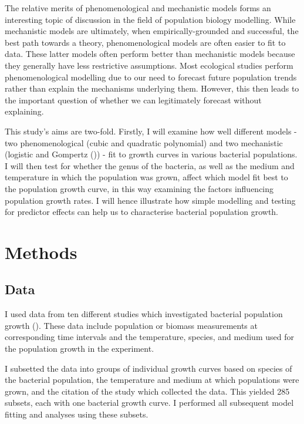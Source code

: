 \documentclass[11pt]{article}
\begin{document}
	The relative merits of phenomenological and mechanistic models forms an interesting topic of discussion in the field of population biology modelling. While mechanistic models are ultimately, when empirically-grounded and successful, the best path towards a theory, phenomenological models are often easier to fit to data. These latter models often perform better than mechanistic models because they generally have less restrictive assumptions. Most ecological studies perform phenomenological modelling due to our need to forecast future population trends rather than explain the mechanisms underlying them. However, this then leads to the important question of whether we can legitimately forecast without explaining.

	This study's aims are two-fold. Firstly, I will examine how well different models - two phenomenological (cubic and quadratic polynomial) and two mechanistic (logistic and Gompertz (\cite{gompertz1825xxiv})) - fit to growth curves in various bacterial populations. I will then test for whether the genus of the bacteria, as well as the medium and temperature in which the population was grown, affect which model fit best to the population growth curve, in this way examining the factors influencing population growth rates. I will hence illustrate how simple modelling and testing for predictor effects can help us to characterise bacterial population growth.

	
	\section{Methods}
	
	\subsection{Data}
	
	I used data from ten different studies which investigated bacterial population growth (\cite{bae2014growth, bernhardt2018metabolic, galarz2016predicting, gill1991growth, phillips1987relation, roth1962continuity, silva2018modelling, sivonen1990effects, stannard1985temperature, zwietering1994modeling}). These data include population or biomass measurements at corresponding time intervals and the temperature, species, and medium used for the population growth in the experiment.
	
	I subsetted the data into groups of individual growth curves based on species of the bacterial population, the temperature and medium at which populations were grown, and the citation of the study which collected the data. This yielded 285 subsets, each with one bacterial growth curve. I performed all subsequent model fitting and analyses using these subsets.
	
\end{document}

